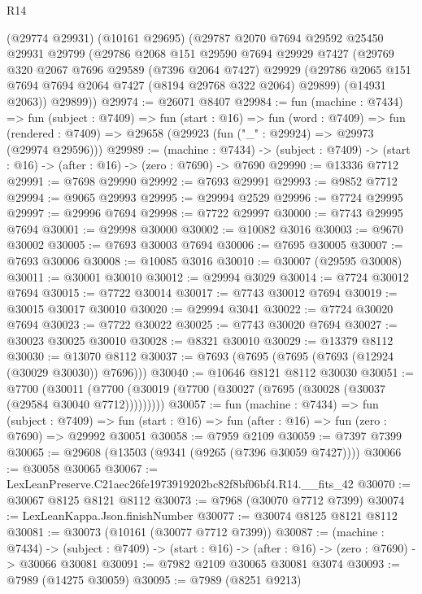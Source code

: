 \begin{lexlean}{R14}
\begin{coremodule}
    (@29774 @29931)
    (@10161 @29695)
    (@29787
      @2070
      @7694
      @29592
      @25450
      @29931
      @29799
      (@29786
        @2068
        @151
        @29590
        @7694
        @29929
        @7427
        (@29769
          @320
          @2067
          @7696
          @29589
          (@7396 @2064 @7427)
          @29929
          (@29786 @2065 @151 @7694 @7694 @2064 @7427 (@8194 @29768 @322 @2064) @29899)
          (@14931 @2063))
        @29899))
@29974 := @26071 @8407
@29984 := fun (machine : @7434) =>
  fun (subject : @7409) =>
  fun (start : @16) =>
  fun (word : @7409) =>
  fun (rendered : @7409) => @29658 (@29923 (fun ("_" : @29924) => @29973 (@29974 @29596)))
@29989 := (machine : @7434) ->
  (subject : @7409) -> (start : @16) -> (after : @16) -> (zero : @7690) -> @7690
@29990 := @13336 @7712
@29991 := @7698 @29990
@29992 := @7693 @29991
@29993 := @9852 @7712
@29994 := @9065 @29993
@29995 := @29994 @2529
@29996 := @7724 @29995
@29997 := @29996 @7694
@29998 := @7722 @29997
@30000 := @7743 @29995 @7694
@30001 := @29998 @30000
@30002 := @10082 @3016
@30003 := @9670 @30002
@30005 := @7693 @30003 @7694
@30006 := @7695 @30005
@30007 := @7693 @30006
@30008 := @10085 @3016
@30010 := @30007 (@29595 @30008)
@30011 := @30001 @30010
@30012 := @29994 @3029
@30014 := @7724 @30012 @7694
@30015 := @7722 @30014
@30017 := @7743 @30012 @7694
@30019 := @30015 @30017 @30010
@30020 := @29994 @3041
@30022 := @7724 @30020 @7694
@30023 := @7722 @30022
@30025 := @7743 @30020 @7694
@30027 := @30023 @30025 @30010
@30028 := @8321 @30010
@30029 := @13379 @8112
@30030 := @13070 @8112
@30037 := @7693 (@7695 (@7695 (@7693 (@12924 (@30029 @30030)) @7696)))
@30040 := @10646 @8121 @8112 @30030
@30051 := @7700
    (@30011 (@7700 (@30019 (@7700 (@30027 (@7695 (@30028 (@30037 (@29584 @30040 @7712)))))))))
@30057 := fun (machine : @7434) =>
  fun (subject : @7409) =>
  fun (start : @16) => fun (after : @16) => fun (zero : @7690) => @29992 @30051
@30058 := @7959 @2109
@30059 := @7397 @7399
@30065 := @29608 (@13503 (@9341 (@9265 (@7396 @30059 @7427))))
@30066 := @30058 @30065
@30067 := LexLeanPreserve.C21aec26fe1973919202bc82f8bf06bf4.R14.__fits_42
@30070 := @30067 @8125 @8121 @8112
@30073 := @7968 (@30070 @7712 @7399)
@30074 := LexLeanKappa.Json.finishNumber
@30077 := @30074 @8125 @8121 @8112
@30081 := @30073 (@10161 (@30077 @7712 @7399))
@30087 := (machine : @7434) ->
  (subject : @7409) -> (start : @16) -> (after : @16) -> (zero : @7690) -> @30066 @30081
@30091 := @7982 @2109 @30065 @30081 @3074
@30093 := @7989 (@14275 @30059)
@30095 := @7989 (@8251 @9213)

\end{coremodule}
\end{lexlean}
